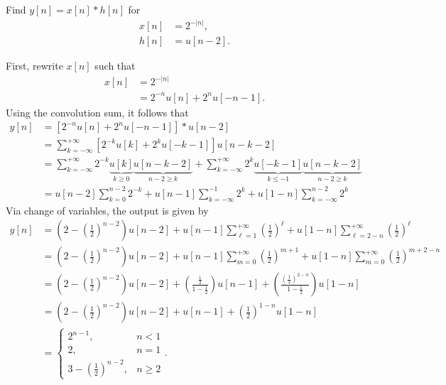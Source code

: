 \documentclass{report}
\begin{document}
\begin{example}
    Find $y[n]=x[n]*h[n]$ for 
    \begin{align*}
        x[n] &= 2^{-|n|}, \\
        h[n] &= u[n-2].
    \end{align*}
\end{example}
\begin{solution}
    First, rewrite $x[n]$ such that
    \begin{align*}
        x[n] &= 2^{-|n|} \\
        &= 2^{-n} u[n] + 2^n u[-n-1].
    \end{align*}
    Using the convolution sum, it follows that 
    \begin{align*}
        y[n] &= [2^{-n} u[n] + 2^n u[-n-1]] * u[n-2] \\
        &= \sum_{k=-\infty}^{+\infty} [2^{-k} u[k] + 2^k u[-k-1]] u[n-k-2] \\
        &= \sum_{k=-\infty}^{+\infty} 2^{-k} \underbrace{u[k]}_\textrm{$k\geq 0$} \underbrace{u[n-k-2]}_\textrm{$n-2\geq k$} + \sum_{k=-\infty}^{+\infty} 2^k \underbrace{u[-k-1]}_\textrm{$k\leq -1$}\underbrace{u[n-k-2]}_\textrm{$n-2\geq k$} \\
        &= u[n-2]\sum_{k=0}^{n-2} 2^{-k} + u[n-1]\sum_{k=-\infty}^{-1} 2^k + u[1-n]\sum_{k=-\infty}^{n-2} 2^k
    \end{align*}
    Via change of variables, the output is given by
    \begin{align*}
        y[n] &= \left(2-\left(\frac{1}{2}\right)^{n-2}\right) u[n-2] + u[n-1]\sum_{\ell=1}^{+\infty} \left(\frac{1}{2}\right)^{\ell} + u[1-n]\sum_{\ell=2-n}^{+\infty} \left(\frac{1}{2}\right)^{\ell} \\
        &= \left(2-\left(\frac{1}{2}\right)^{n-2}\right) u[n-2] + u[n-1]\sum_{m=0}^{+\infty} \left(\frac{1}{2}\right)^{m+1} + u[1-n]\sum_{m=0}^{+\infty} \left(\frac{1}{2}\right)^{m+2-n} \\
        &= \left(2-\left(\frac{1}{2}\right)^{n-2}\right) u[n-2] + \left(\frac{\frac{1}{2}}{1-\frac{1}{2}}\right)u[n-1] + \left(\frac{\left(\frac{1}{2}\right)^{2-n}}{1-\frac{1}{2}}\right)u[1-n] \\
        &= \left(2-\left(\frac{1}{2}\right)^{n-2}\right) u[n-2] + u[n-1] + \left(\frac{1}{2}\right)^{1-n}u[1-n] \\
        &= \begin{cases} 
            2^{n-1}, & n<1 \\
            2, & n=1 \\
            3-\left(\frac{1}{2}\right)^{n-2}, & n\geq 2
        \end{cases}.
    \end{align*}
\end{solution}
\end{document}
